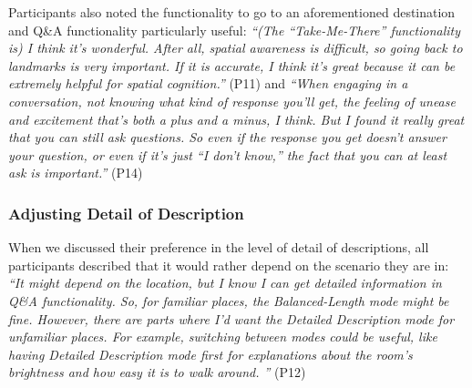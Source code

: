 

Participants also noted the functionality to go to an aforementioned destination and Q\&A functionality particularly useful:
\newanswer[\label{P11TakeMeBack}]\textit{``(The ``Take-Me-There'' functionality is) I think it's wonderful. After all, spatial awareness is difficult, so going back to landmarks is very important. If it is accurate, I think it's great because it can be extremely helpful for spatial cognition.''} (P11) and
\newanswer[\label{P14Q&A}]\textit{``When engaging in a conversation, not knowing what kind of response you'll get, the feeling of unease and excitement that's both a plus and a minus, I think. But I found it really great that you can still ask questions. So even if the response you get doesn't answer your question, or even if it's just ``I don't know,'' the fact that you can at least ask is important.''} (P14) 

\subsubsection{Adjusting Detail of Description}
When we discussed their preference in the level of detail of descriptions, all participants described that it would rather depend on the scenario they are in:
\newanswer[\label{P12NormalMode}]\textit{``It might depend on the location, but I know I can get detailed information in Q\&A functionality. So, for familiar places, the Balanced-Length mode might be fine. However, there are parts where I'd want the Detailed Description mode for unfamiliar places. For example, switching between modes could be useful, like having Detailed Description mode first for explanations about the room's brightness and how easy it is to walk around. ''} (P12)

